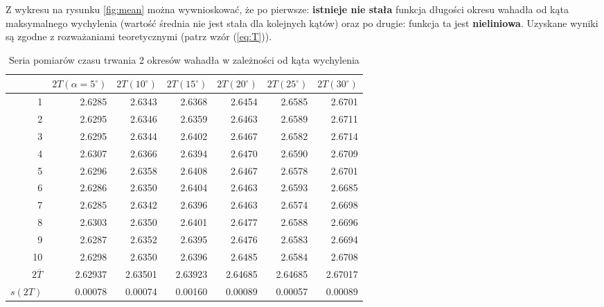 \documentclass[a4paper]{article}
\begin{document}
Z wykresu na rysunku \ref{fig:mean} można wywnioskować, że po pierwsze: \textbf{istnieje nie stała} funkcja długości okresu wahadła od kąta maksymalnego wychylenia (wartość średnia nie jest stała dla kolejnych kątów) oraz po drugie: funkcja ta jest \textbf{nieliniowa}. 
Uzyskane wyniki są zgodne z rozważaniami teoretycznymi (patrz wzór (\ref{eq:T})).


\begin{table}[h!]
\centering
	\begin{tabular}{rrrrrrr}
	\toprule
	{} &$2T(\alpha=5^\circ)$ &$2T(10^\circ)$ &$2T(15^\circ)$ &$2T(20^\circ)$ &$2T(25^\circ)$ &$2T(30^\circ)$ \\
	\midrule
	1 &  2.6285 &  2.6343 &  2.6368 &  2.6454 &  2.6585 &  2.6701 \\
	2 &  2.6295 &  2.6346 &  2.6359 &  2.6463 &  2.6589 &  2.6711 \\
	3 &  2.6295 &  2.6344 &  2.6402 &  2.6467 &  2.6582 &  2.6714 \\
	4 &  2.6307 &  2.6366 &  2.6394 &  2.6470 &  2.6590 &  2.6709 \\
	5 &  2.6296 &  2.6358 &  2.6408 &  2.6467 &  2.6578 &  2.6701 \\
	6 &  2.6286 &  2.6350 &  2.6404 &  2.6463 &  2.6593 &  2.6685 \\
	7 &  2.6285 &  2.6342 &  2.6396 &  2.6463 &  2.6574 &  2.6698 \\
	8 &  2.6303 &  2.6350 &  2.6401 &  2.6477 &  2.6588 &  2.6696 \\
	9 &  2.6287 &  2.6352 &  2.6395 &  2.6476 &  2.6583 &  2.6694 \\
	10 &  2.6298 &  2.6350 &  2.6396 &  2.6485 &  2.6584 &  2.6708 \\
	\midrule
	$2\overline{T}$& 2.62937 & 2.63501 & 2.63923 & 2.64685 & 2.64685 & 2.67017 \\ 
	$s(2T)$ & 0.00078 & 0.00074 & 0.00160 & 0.00089 & 0.00057 & 0.00089 \\
	\bottomrule
\end{tabular}
\caption{Seria pomiarów czasu trwania 2 okresów wahadła w zależności od kąta wychylenia}
\label{pomiary_1}
\end{table}
\end{document}
